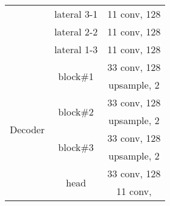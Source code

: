 \documentclass[journal]{IEEEtran}
\begin{document}
\begin{table}[htb]
\begin{tabular}{ccc}
    \multicolumn{1}{c|}{}                          & \multicolumn{1}{c|}{lateral 3-1}               & 11 conv, 128           \\ \cline{2-3}
    \multicolumn{1}{c|}{}                          & \multicolumn{1}{c|}{lateral 2-2}               & 11 conv, 128           \\ \cline{2-3}
    \multicolumn{1}{c|}{}                          & \multicolumn{1}{c|}{lateral 1-3}               & 11 conv, 128           \\ \hline
    \multicolumn{1}{c|}{\multirow{8}{*}{Decoder}}  & \multicolumn{1}{c|}{\multirow{2}{*}{block\#1}} & 33 conv, 128           \\
    \multicolumn{1}{c|}{}                          & \multicolumn{1}{c|}{}                          & upsample, 2                    \\ \cline{2-3}
    \multicolumn{1}{c|}{}                          & \multicolumn{1}{c|}{\multirow{2}{*}{block\#2}} & 33 conv, 128           \\
    \multicolumn{1}{c|}{}                          & \multicolumn{1}{c|}{}                          & upsample, 2                    \\ \cline{2-3}
    \multicolumn{1}{c|}{}                          & \multicolumn{1}{c|}{\multirow{2}{*}{block\#3}} & 33 conv, 128           \\
    \multicolumn{1}{c|}{}                          & \multicolumn{1}{c|}{}                          & upsample, 2                    \\ \cline{2-3}
    \multicolumn{1}{c|}{}                          & \multicolumn{1}{c|}{\multirow{2}{*}{head}}     & 33 conv, 128           \\
    \multicolumn{1}{c|}{}                          & \multicolumn{1}{c|}{}                          & 11 conv,            \\ \hline
  \end{tabular}
\end{table}
\end{document}
